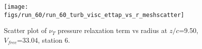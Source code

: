 \begin{figure}[H]
\centering
\texttt{[image: figs/run\_60/run\_60\_turb\_visc\_ettap\_vs\_r\_meshscatter]}
\caption{Scatter plot of $\nu_T$ pressure relaxation term vs radius at $z/c$=9.50, $V_{free}$=33.04, station 6.}
\label{fig:run_60_turb_visc_ettap_vs_r_meshscatter}
\end{figure}



